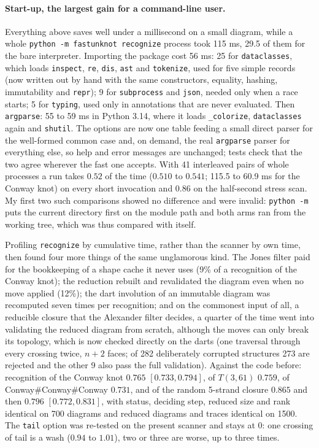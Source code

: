 \paragraph{Start-up, the largest gain for a command-line user.} Everything above
saves well under a millisecond on a small diagram, while a whole
\texttt{python -m fastunknot recognize} process took 115 ms, 29.5 of them for
the bare interpreter. Importing the package cost 56 ms: 25 for
\texttt{dataclasses}, which loads \texttt{inspect}, \texttt{re}, \texttt{dis},
\texttt{ast} and \texttt{tokenize}, used for five simple records (now written
out by hand with the same constructors, equality, hashing, immutability and
\texttt{repr}); 9 for \texttt{subprocess} and \texttt{json}, needed only when a
race starts; 5 for \texttt{typing}, used only in annotations that are never
evaluated. Then \texttt{argparse}: 55 to 59 ms in Python 3.14, where it loads
\texttt{\_colorize}, \texttt{dataclasses} again and \texttt{shutil}. The
options are now one table feeding a small direct parser for the well-formed
common case and, on demand, the real \texttt{argparse} parser for everything
else, so help and error messages are unchanged; tests check that the two agree
wherever the fast one accepts. With 41 interleaved pairs of whole processes a
run takes $0.52$ of the time ($0.510$ to $0.541$; 115.5 to 60.9 ms for the
Conway knot) on every short invocation and $0.86$ on the half-second stress
scan. My first two such comparisons showed no difference and were invalid:
\texttt{python -m} puts the current directory first on the module path and both
arms ran from the working tree, which was thus compared with itself.

Profiling \texttt{recognize} by cumulative time, rather than the scanner by own
time, then found four more things of the same unglamorous kind. The Jones
filter paid for the bookkeeping of a shape cache it never uses (9\% of a
recognition of the Conway knot); the reduction rebuilt and revalidated the
diagram even when no move applied (12\%); the dart involution of an immutable
diagram was recomputed seven times per recognition; and on the commonest input
of all, a reducible closure that the Alexander filter decides, a quarter of the
time went into validating the reduced diagram from scratch, although the moves
can only break its topology, which is now checked directly on the darts (one
traversal through every crossing twice, $n+2$ faces; of 282 deliberately
corrupted structures 273 are rejected and the other 9 also pass the full
validation). Against the code before: recognition of the Conway knot $0.765$
$[0.733, 0.794]$, of $T(3,61)$ $0.759$, of Conway\#Conway\#Conway $0.731$, and
of the random 5-strand closure $0.865$ and then $0.796$ $[0.772, 0.831]$, with
status, deciding step, reduced size and rank identical on 700 diagrams and
reduced diagrams and traces identical on 1500. The \texttt{tail} option was
re-tested on the present scanner and stays at 0: one crossing of tail is a wash
($0.94$ to $1.01$), two or three are worse, up to three times.

